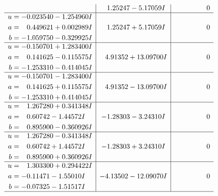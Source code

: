 \documentclass[1p]{elsarticle_modified}
\theoremstyle{definition}
\begin{document}
$$\begin{array}{c|c|c}
 & \phantom{-}1.25247 - 5.17059 I & \phantom{-0.000000 } 0 \\ \hline\begin{aligned}
u &= -0.023540 - 1.254960 I \\
a &= \phantom{-}0.449621 + 0.002989 I \\
b &= -1.059750 - 0.329925 I\end{aligned}
 & \phantom{-}1.25247 + 5.17059 I & \phantom{-0.000000 } 0 \\ \hline\begin{aligned}
u &= -0.150701 + 1.283400 I \\
a &= \phantom{-}0.141625 - 0.115575 I \\
b &= -1.253310 - 0.414045 I\end{aligned}
 & \phantom{-}4.91352 + 13.09700 I & \phantom{-0.000000 } 0 \\ \hline\begin{aligned}
u &= -0.150701 - 1.283400 I \\
a &= \phantom{-}0.141625 + 0.115575 I \\
b &= -1.253310 + 0.414045 I\end{aligned}
 & \phantom{-}4.91352 - 13.09700 I & \phantom{-0.000000 } 0 \\ \hline\begin{aligned}
u &= \phantom{-}1.267280 + 0.341348 I \\
a &= \phantom{-}0.60742 - 1.44572 I \\
b &= \phantom{-}0.895900 - 0.360926 I\end{aligned}
 & -1.28303 - 3.24310 I & \phantom{-0.000000 } 0 \\ \hline\begin{aligned}
u &= \phantom{-}1.267280 - 0.341348 I \\
a &= \phantom{-}0.60742 + 1.44572 I \\
b &= \phantom{-}0.895900 + 0.360926 I\end{aligned}
 & -1.28303 + 3.24310 I & \phantom{-0.000000 } 0 \\ \hline\begin{aligned}
u &= \phantom{-}1.303300 + 0.294422 I \\
a &= -0.11471 - 1.55010 I \\
b &= -0.07325 - 1.51517 I\end{aligned}
 & -4.13502 - 12.09070 I & \phantom{-0.000000 } 0\\
 \hline 
 \end{array}$$\newpage$$\begin{array}{c|c|c}  

\end{array}$$
\end{document}
